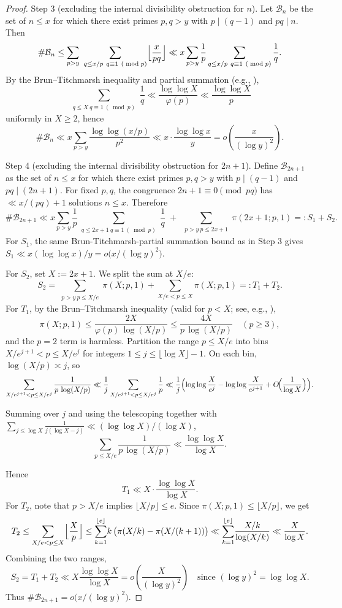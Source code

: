 \begin{proof}
Step 3 (excluding the internal divisibility obstruction for $n$). Let $\mathcal B_n$ be the set of $n\le x$ for which there exist primes $p,q>y$ with $p\mid(q-1)$ and $pq\mid n$. Then
$$\#\mathcal B_n\le \sum_{p>y}\ \sum_{\substack{q\le x/p\ q\equiv1\ (\bmod p)}} \Bigl\lfloor\frac{x}{pq}\Bigr\rfloor\ll x\sum_{p>y}\frac{1}{p}\sum_{\substack{q\le x/p\ q\equiv1\ (\bmod p)}}\frac{1}{q}.$$
By the Brun--Titchmarsh inequality and partial summation (e.g., \cite{MV2007,IK2004}),
$$\sum_{\substack{q\le X\ q\equiv1\ (\bmod p)}}\frac{1}{q}\ll \frac{\log\log X}{\varphi(p)}\ll \frac{\log\log X}{p}$$
uniformly in $X\ge2$, hence
$$\#\mathcal B_n\ll x\sum_{p>y}\frac{\log\log(x/p)}{p^2}\ll x\cdot\frac{\log\log x}{y}=o\!\left(\frac{x}{(\log y)^2}\right).$$

Step 4 (excluding the internal divisibility obstruction for $2n+1$). Define $\mathcal B_{2n+1}$ as the set of $n\le x$ for which there exist primes $p,q>y$ with $p\mid(q-1)$ and $pq\mid(2n+1)$. For fixed $p,q$, the congruence $2n+1\equiv0\pmod{pq}$ has $\ll x/(pq)+1$ solutions $n\le x$. Therefore
\[
\#\mathcal B_{2n+1}\ll x\sum_{p>y}\frac{1}{p}\sum_{\substack{q\le 2x+1\ q\equiv1\ (\bmod p)}}\frac{1}{q}\; +\; \sum_{\substack{p>y\ p\le 2x+1}}\!\pi(2x+1; p,1)=:S_1+S_2.
\]
For $S_1$, the same Brun-Titchmarsh-partial summation bound as in Step 3 gives $S_1\ll x(\log\log x)/y=o\bigl(x/(\log y)^2\bigr)$.

For $S_2$, set $X:=2x+1$. We split the sum at $X/e$:
$$S_2=\sum_{\substack{p>y\ p\le X/e}}\!\pi(X;p,1)+\sum_{X/e<p\le X}\!\pi(X;p,1)=:T_1+T_2.$$
For $T_1$, by the Brun--Titchmarsh inequality (valid for $p<X$; see, e.g., \cite{MV2007,IK2004}),
$$\pi(X;p,1)\le \frac{2X}{\varphi(p)\,\log(X/p)}\le \frac{4X}{p\,\log(X/p)}\quad(p\ge3),$$
and the $p=2$ term is harmless. Partition the range $p\le X/e$ into bins $X/e^{j+1}<p\le X/e^{j}$ for integers $1\le j\le \lfloor\log X\rfloor-1$. On each bin, $\log(X/p)\asymp j$, so
$$\sum_{X/e^{j+1}<p\le X/e^{j}} \frac{1}{p\,\log(X/p)}\ll \frac{1}{j}\sum_{X/e^{j+1}<p\le X/e^{j}}\frac{1}{p}
\ll \frac{1}{j}\Bigl(\log\log\frac{X}{e^{j}}-\log\log\frac{X}{e^{j+1}}+O\!\Bigl(\frac{1}{\log X}\Bigr)\Bigr).$$
\begin{flushleft}
Summing over $j$ and using the telescoping together with $\sum_{j\le \log X} \frac{1}{j(\log X-j)}\ll (\log\log X)/(\log X)$,
$$\sum_{p\le X/e}\frac{1}{p\,\log(X/p)}\ll \frac{\log\log X}{\log X}.$$
\end{flushleft}
Hence
$$T_1\ll X\cdot\frac{\log\log X}{\log X}.$$
For $T_2$, note that $p>X/e$ implies $\lfloor X/p\rfloor\le e$. Since $\pi(X;p,1)\le \lfloor X/p\rfloor$, we get
$$T_2\le \sum_{X/e<p\le X}\Bigl\lfloor\frac{X}{p}\Bigr\rfloor\le \sum_{k=1}^{\lfloor e\rfloor}\!k\,\bigl(\pi(X/k)-\pi(X/(k+1))\bigr)\ll \sum_{k=1}^{\lfloor e\rfloor}\!\frac{X/k}{\log(X/k)}\ll \frac{X}{\log X}.$$
Combining the two ranges,
$$S_2=T_1+T_2\ll X\frac{\log\log X}{\log X}=o\!\left(\frac{X}{(\log y)^2}\right)\quad\text{since }(\log y)^2=\log\log X.$$
Thus $\#\mathcal B_{2n+1}=o\bigl(x/(\log y)^2\bigr)$.


\end{proof}
